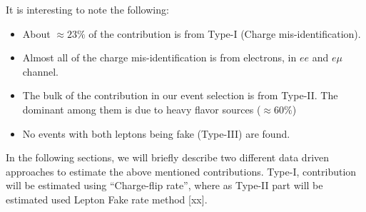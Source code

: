 It is interesting to note the following:
\begin{itemize}
\item About $\approx 23 \%$ of the contribution is from Type-I (Charge mis-identification).
\item Almost all of the charge mis-identification is from electrons, in $ee$ and $e\mu$ channel.
\item The bulk of the \ttbar contribution in our event selection is from Type-II. The dominant among them 
is due to heavy flavor sources ($\approx 60 \%$)
\item No events with both leptons being fake (Type-III) are found.
\end{itemize} 

In the following sections, we will briefly describe two different data driven approaches to 
estimate the above mentioned contributions. Type-I, contribution will be estimated using ``Charge-flip rate'', 
where as Type-II part will be estimated used Lepton Fake rate method [xx].



